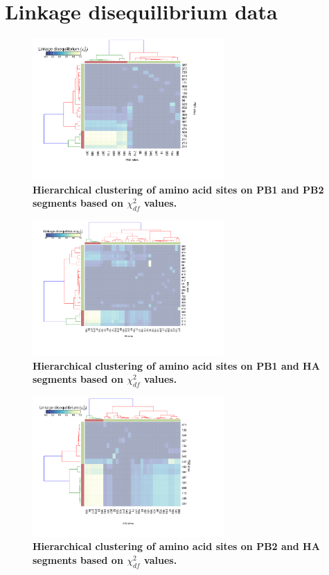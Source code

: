 \documentclass[11pt,oneside,letterpaper]{article}
\begin{document}
\section*{Linkage disequilibrium data}

\begin{figure}
\centering  
\includegraphics[width=0.65\textwidth]  {supp_figures/Chi_PB1_PB2.png}
\caption{\textbf{Hierarchical clustering of amino acid sites on PB1 and PB2 segments based on $\chi^{2}_{df}$ values.}}
\label{ChiPB1PB2}
\end{figure}


\begin{figure}
\centering  
\includegraphics[width=0.65\textwidth]  {supp_figures/Chi_PB1_HA.png}
\caption{\textbf{Hierarchical clustering of amino acid sites on PB1 and HA segments based on $\chi^{2}_{df}$ values.}}
\label{ChiPB1HA}
\end{figure}


\begin{figure}
\centering  
\includegraphics[width=0.65\textwidth]  {supp_figures/Chi_PB2_HA.png}
\caption{\textbf{Hierarchical clustering of amino acid sites on PB2 and HA segments based on $\chi^{2}_{df}$ values.}}
\label{ChiPB2HA}
\end{figure}
\end{document}
